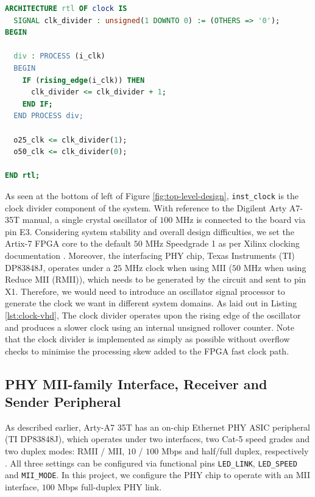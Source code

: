 \documentclass[a4paper]{report}
\newcommand{\code}{\texttt}
\begin{document}
\begin{lstlisting}[language=VHDL, caption=Snippet of Clock Divider \code{clock.vhd}, label={lst:clock-vhd}]
ARCHITECTURE rtl OF clock IS
  SIGNAL clk_divider : unsigned(1 DOWNTO 0) := (OTHERS => '0');
BEGIN

  div : PROCESS (i_clk)
  BEGIN
    IF (rising_edge(i_clk)) THEN
      clk_divider <= clk_divider + 1;
    END IF;
  END PROCESS div;

  o25_clk <= clk_divider(1);
  o50_clk <= clk_divider(0);
 
END rtl;
\end{lstlisting}

As seen at the bottom of left of Figure \ref{fig:top-level-design}, \code{inst\_clock} is the clock divider component of the system. With reference to the Digilent Arty A7-35T manual\cite{digilent-arty}, a single crystal oscillator of $100$ MHz is connected to the board via pin E3. Considering system stability and overall design difficulties, we set the Artix-7 FPGA core to the default $50$ MHz Speedgrade 1 as per Xilinx clocking documentation \cite{xilinx-7-clocking}. Moreover, the interfacing PHY chip, Texas Instruments (TI) DP83848J, operates under a $25$ MHz clock when using MII ($50$ MHz when using Reduce MII (RMII)), which needs to be generated by the circuit and sent to pin X1\cite{texas-instruments-dp83848x}. Therefore, we would need to introduce an oscillator signal processor to generate the clock we want in different system domains. As laid out in Listing \ref{lst:clock-vhd}, The clock divider operates upon the rising edge of the oscillator and produces a slower clock using an internal unsigned rollover counter. Note that the clock divider is implemented as simply as possible without overflow checks to minimise the processing skew added to the FPGA fast clock path.

\subsection{PHY MII-family Interface, Receiver and Sender Peripheral}
\label{section:implementation-hardware-implementation-phy-mac-peripheral}

As described earlier, Arty-A7 35T has an on-chip Ethernet PHY ASIC peripheral (TI DP83848J), which operates under two interfaces, two Cat-5 speed grades and two duplex modes: RMII / MII, $10$ / $100$ Mbps and half/full duplex, respectively \cite{texas-instruments-dp83848x}. All three settings can be configured via functional pins \code{LED\_LINK}, \code{LED\_SPEED} and \code{MII\_MODE}. In this project, we configure the PHY chip to operate with an MII interface, $100$ Mbps full-duplex PHY link.
\end{document}
